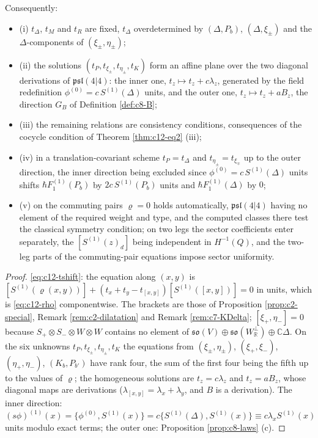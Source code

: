 \begin{theorem}
Consequently:
\begin{itemize}
\item (i) $t_\Delta$, $t_M$ and $t_R$ are fixed, $t_\Delta$ overdetermined by $(\Delta,P_b)$, $(\Delta,\xi_\pm)$ and the $\Delta$-components of $(\xi_\pm,\eta_\pm)$;
\item (ii) the solutions $(t_P,t_{\xi_\pm},t_{\eta_\pm},t_K)$ form an affine plane over the two diagonal derivations of $\mathfrak{psl}(4|4)$: the inner one, $t_z\mapsto t_z+c\lambda_z$, generated by the field redefinition $\phi^{(0)}=c\,S^{(1)}(\Delta)$ units, and the outer one, $t_z\mapsto t_z+aB_z$, the direction $G_B$ of Definition \ref{def:c8-B};
\item (iii) the remaining relations are consistency conditions, consequences of the cocycle condition of Theorem \ref{thm:c12-eq2} (iii);
\item (iv) in a translation-covariant scheme $t_P=t_\Delta$ and $t_{\eta_\pm}=t_{\xi_\mp}$ up to the outer direction, the inner direction being excluded since $\phi^{(0)}=c\,S^{(1)}(\Delta)$ units shifts $\hbar F_1^{(1)}(P_b)$ by $2c\,S^{(1)}(P_b)$ units and $\hbar F_1^{(1)}(\Delta)$ by $0$;
\item (v) on the commuting pairs $\varrho=0$ holds automatically, $\mathfrak{psl}(4|4)$ having no element of the required weight and type, and the computed classes there test the classical symmetry condition; on two legs the sector coefficients enter separately, the $[S^{(1)}(z)_d]$ being independent in $H^{-1}(Q)$, and the two-leg parts of the commuting-pair equations impose sector uniformity.
\end{itemize}
\end{theorem}

\begin{proof}
\eqref{eq:c12-tshift}: the equation along $(x,y)$ is $[S^{(1)}(\varrho(x,y))]+(t_x+t_y-t_{[x,y]})[S^{(1)}([x,y])]=0$ in units, which is \eqref{eq:c12-rho} componentwise. The brackets are those of Proposition \ref{prop:c2-special}, Remark \ref{rem:c2-dilatation} and Remark \ref{rem:c7-KDelta}; $[\xi_+,\eta_-]=0$ because $S_+\otimes S_-\otimes W\otimes W$ contains no element of $\mathfrak{so}(V)\oplus\mathfrak{so}(W_{\mathbb R}^\perp)\oplus\mathbb C\Delta$. On the six unknowns $t_P,t_{\xi_\pm},t_{\eta_\pm},t_K$ the equations from $(\xi_\pm,\eta_\pm)$, $(\xi_+,\xi_-)$, $(\eta_+,\eta_-)$, $(K_b,P_{b'})$ have rank four, the sum of the first four being the fifth up to the values of $\varrho$; the homogeneous solutions are $t_z=c\lambda_z$ and $t_z=aB_z$, whose diagonal maps are derivations ($\lambda_{[x,y]}=\lambda_x+\lambda_y$, and $B$ is a derivation). The inner direction: $(s\phi)^{(1)}(x)=\{\phi^{(0)},S^{(1)}(x)\}=c\{S^{(1)}(\Delta),S^{(1)}(x)\}\equiv c\lambda_xS^{(1)}(x)$ units modulo exact terms; the outer one: Proposition \ref{prop:c8-laws} (c).
\end{proof}

